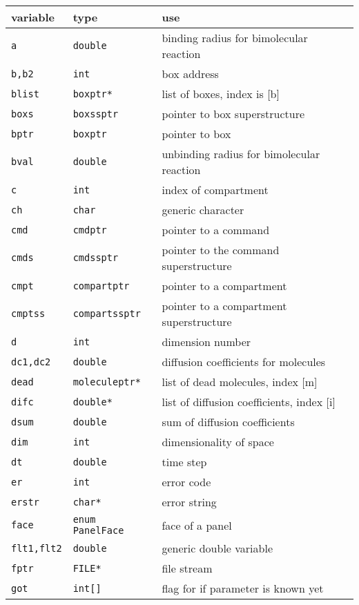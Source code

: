 \documentclass {book}
\begin{document}
\begin{longtable}[c]{lll}
variable & type & use\\
\hline
\texttt{a} & \texttt{double} & binding radius for bimolecular reaction\\
\texttt{b,b2} & \texttt{int} & box address\\
\texttt{blist} & \texttt{boxptr*} & list of boxes, index is [b]\\
\texttt{boxs} & \texttt{boxssptr} & pointer to box superstructure\\
\texttt{bptr} & \texttt{boxptr} & pointer to box\\
\texttt{bval} & \texttt{double} & unbinding radius for bimolecular reaction\\
\texttt{c} & \texttt{int} & index of compartment\\
\texttt{ch} & \texttt{char} & generic character\\
\texttt{cmd} & \texttt{cmdptr} & pointer to a command\\
\texttt{cmds} & \texttt{cmdssptr} & pointer to the command superstructure\\
\texttt{cmpt} & \texttt{compartptr} & pointer to a compartment\\
\texttt{cmptss} & \texttt{compartssptr} & pointer to a compartment superstructure\\
\texttt{d} & \texttt{int} & dimension number\\
\texttt{dc1,dc2} & \texttt{double} & diffusion coefficients for molecules\\
\texttt{dead} & \texttt{moleculeptr*} & list of dead molecules, index [m]\\
\texttt{difc} & \texttt{double*} & list of diffusion coefficients, index [i]\\
\texttt{dsum} & \texttt{double} & sum of diffusion coefficients\\
\texttt{dim} & \texttt{int} & dimensionality of space\\
\texttt{dt} & \texttt{double} & time step\\
\texttt{er} & \texttt{int} & error code\\
\texttt{erstr} & \texttt{char*} & error string\\
\texttt{face} & \texttt{enum PanelFace} & face of a panel\\
\texttt{flt1,flt2} & \texttt{double} & generic double variable\\
\texttt{fptr} & \texttt{FILE*} & file stream\\
\texttt{got} & \texttt{int[]} & flag for if parameter is known yet\\

\end{longtable}
\end{document}
